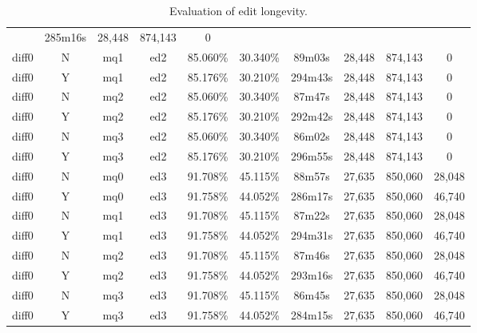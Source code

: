 \begin{sidewaystable}[!tp]
\begin{center}
\begin{tabular}{|c|c|c|c||c|c||c|c|c|c|}
	& 285m16s & 28,448
	& 874,143 & 0 \\
diff0 & N & mq1 & ed2
	& 85.060\% & 30.340\%
	& 89m03s & 28,448
	& 874,143 & 0 \\
diff0 & Y & mq1 & ed2
	& 85.176\% & 30.210\%
	& 294m43s & 28,448
	& 874,143 & 0 \\
diff0 & N & mq2 & ed2
	& 85.060\% & 30.340\%
	& 87m47s & 28,448
	& 874,143 & 0 \\
diff0 & Y & mq2 & ed2
	& 85.176\% & 30.210\%
	& 292m42s & 28,448
	& 874,143 & 0 \\
diff0 & N & mq3 & ed2
	& 85.060\% & 30.340\%
	& 86m02s & 28,448
	& 874,143 & 0 \\
diff0 & Y & mq3 & ed2
	& 85.176\% & 30.210\%
	& 296m55s & 28,448
	& 874,143 & 0 \\
diff0 & N & mq0 & ed3
	& 91.708\% & 45.115\%
	& 88m57s & 27,635
	& 850,060 & 28,048 \\
diff0 & Y & mq0 & ed3
	& 91.758\% & 44.052\%
	& 286m17s & 27,635
	& 850,060 & 46,740 \\
diff0 & N & mq1 & ed3
	& 91.708\% & 45.115\%
	& 87m22s & 27,635
	& 850,060 & 28,048 \\
diff0 & Y & mq1 & ed3
	& 91.758\% & 44.052\%
	& 294m31s & 27,635
	& 850,060 & 46,740 \\
diff0 & N & mq2 & ed3
	& 91.708\% & 45.115\%
	& 87m46s & 27,635
	& 850,060 & 28,048 \\
diff0 & Y & mq2 & ed3
	& 91.758\% & 44.052\%
	& 293m16s & 27,635
	& 850,060 & 46,740 \\
diff0 & N & mq3 & ed3
	& 91.708\% & 45.115\%
	& 86m45s & 27,635
	& 850,060 & 28,048 \\
diff0 & Y & mq3 & ed3
	& 91.758\% & 44.052\%
	& 284m15s & 27,635
	& 850,060 & 46,740 \\
\hline
    \end{tabular}
  \end{center}
  \caption{Evaluation of edit longevity.}
\end{sidewaystable}


